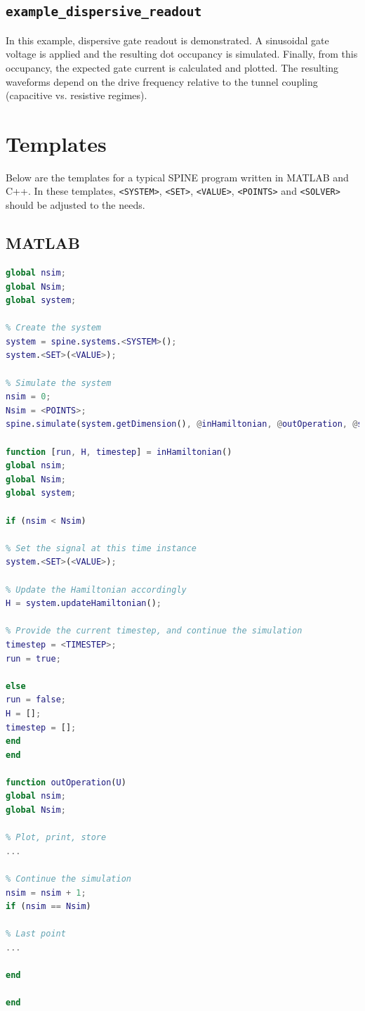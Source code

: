 \documentclass[10pt,a4paper,onecolumn,notitlepage]{article}
\begin{document}
\subsection{\lstinline{example_dispersive_readout}}
In this example, dispersive gate readout is demonstrated. A sinusoidal gate voltage is applied and the resulting dot occupancy is simulated. Finally, from this occupancy, the expected gate current is calculated and plotted. The resulting waveforms depend on the drive frequency relative to the tunnel coupling (capacitive vs. resistive regimes).

\section{Templates}
Below are the templates for a typical SPINE program written in MATLAB and C++. In these templates, \lstinline{<SYSTEM>}, \lstinline{<SET>}, \lstinline{<VALUE>}, \lstinline{<POINTS>} and \lstinline{<SOLVER>} should be adjusted to the needs.

\subsection{MATLAB}
\begin{lstlisting}[language=MATLAB]
% Global variables
global nsim;
global Nsim;
global system;

% Create the system
system = spine.systems.<SYSTEM>();
system.<SET>(<VALUE>);

% Simulate the system
nsim = 0;
Nsim = <POINTS>;
spine.simulate(system.getDimension(), @inHamiltonian, @outOperation, @spine.solvers.<SOLVER>);

function [run, H, timestep] = inHamiltonian()
global nsim;
global Nsim;
global system;

if (nsim < Nsim)

% Set the signal at this time instance
system.<SET>(<VALUE>);

% Update the Hamiltonian accordingly
H = system.updateHamiltonian();

% Provide the current timestep, and continue the simulation
timestep = <TIMESTEP>;
run = true;

else
run = false;
H = [];
timestep = [];
end
end

function outOperation(U)
global nsim;
global Nsim;

% Plot, print, store
...

% Continue the simulation
nsim = nsim + 1;
if (nsim == Nsim)

% Last point
...

end

end
\end{lstlisting}
\end{document}
